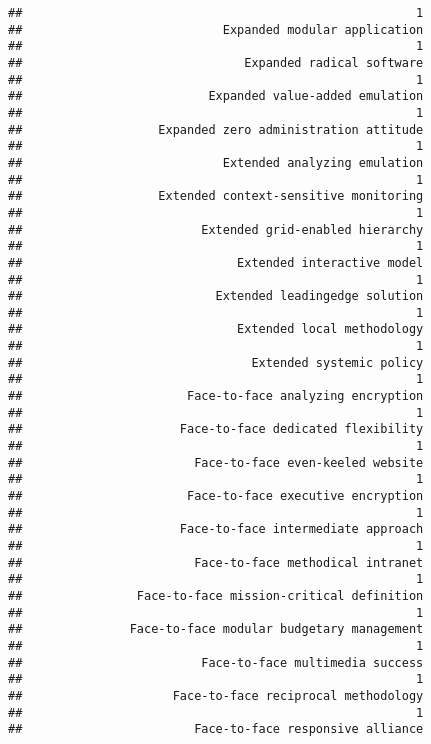 \documentclass[
]{article}
\begin{document}
\begin{verbatim}
##                                                       1 
##                            Expanded modular application 
##                                                       1 
##                               Expanded radical software 
##                                                       1 
##                          Expanded value-added emulation 
##                                                       1 
##                   Expanded zero administration attitude 
##                                                       1 
##                            Extended analyzing emulation 
##                                                       1 
##                   Extended context-sensitive monitoring 
##                                                       1 
##                         Extended grid-enabled hierarchy 
##                                                       1 
##                              Extended interactive model 
##                                                       1 
##                           Extended leadingedge solution 
##                                                       1 
##                              Extended local methodology 
##                                                       1 
##                                Extended systemic policy 
##                                                       1 
##                       Face-to-face analyzing encryption 
##                                                       1 
##                      Face-to-face dedicated flexibility 
##                                                       1 
##                        Face-to-face even-keeled website 
##                                                       1 
##                       Face-to-face executive encryption 
##                                                       1 
##                      Face-to-face intermediate approach 
##                                                       1 
##                        Face-to-face methodical intranet 
##                                                       1 
##                Face-to-face mission-critical definition 
##                                                       1 
##               Face-to-face modular budgetary management 
##                                                       1 
##                         Face-to-face multimedia success 
##                                                       1 
##                     Face-to-face reciprocal methodology 
##                                                       1 
##                        Face-to-face responsive alliance 

\end{verbatim}
\end{document}
